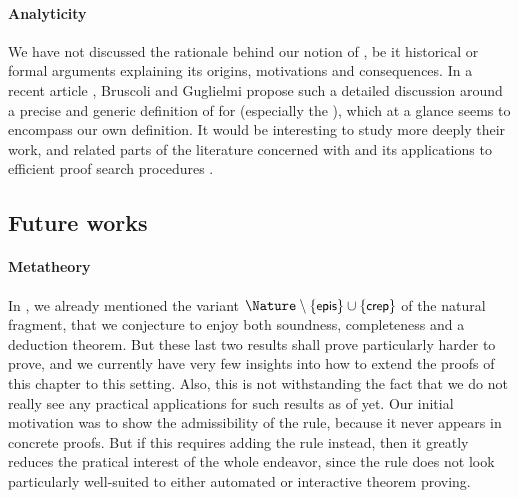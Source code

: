 \begin{scope}
\paragraph{Analyticity}

We have not discussed the rationale behind our notion of , be it
historical or formal arguments explaining its origins, motivations and
consequences. In a recent article , Bruscoli
and Guglielmi propose such a detailed discussion around a precise and generic
definition of  for   (especially
the ), which at a glance seems to encompass our own
definition. It would be interesting to study more deeply their work, and related
parts of the  literature concerned with  and its
applications to efficient proof search procedures
.

\subsection{Future works}

\paragraph{Metatheory}

In , we already mentioned the variant $\Nature \setminus
\{\rsf{epis}\} \cup \{\rsf{crep}\}$ of the natural fragment, that we conjecture
to enjoy both soundness, completeness and a deduction theorem. But these last
two results shall prove particularly harder to prove, and we currently have very
few insights into how to extend the proofs of this chapter to this setting.
Also, this is not withstanding the fact that we do not really see any practical
applications for such results as of yet. Our initial motivation was to show the
admissibility of the  rule, because it never appears in concrete
proofs. But if this requires adding the  rule instead, then it greatly
reduces the pratical interest of the whole endeavor, since the  rule
does not look particularly well-suited to either automated or interactive
theorem proving.


\end{scope}
